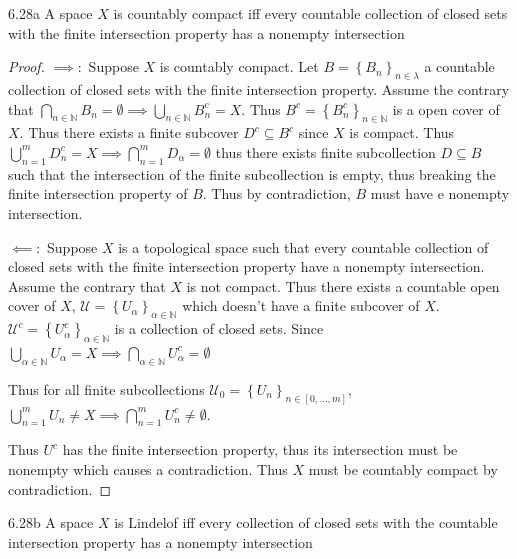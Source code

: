 \documentclass{article}
\newcommand{\N}{\mathbb{N}}
\begin{document}
\bigskip

\begin{claim}{6.28a}\label{Claim 6.28a.}
    A space $X$ is countably compact iff every countable collection of closed sets with the finite intersection property has a nonempty intersection 
\end{claim}
\begin{proof}
    $\implies:$ Suppose $X$ is countably compact. Let $B = \left\{ B_n \right\}_{n \in \lambda}$ a countable collection of closed sets with the finite intersection property.  Assume the contrary that $\bigcap_{n \in \N} B_n = \emptyset \implies \bigcup_{n \in \N} B_{n}^c = X$. Thus $B^c = \left\{ B_{n}^c \right\}_{n \in \N}$ is a open cover of $X$. Thus there exists a finite subcover $D^c \subseteq B^c$ since $X$ is compact. Thus $\bigcup_{n = 1}^m D^c_n = X \implies \bigcap_{n = 1}^m D_\alpha = \emptyset$ thus there exists finite subcollection $D \subseteq B$ such that the intersection of the finite subcollection is empty, thus breaking the finite intersection property of $B$. Thus by contradiction, $B$ must have e nonempty intersection.
    
    $\impliedby:$ Suppose $X$ is a topological space such that every countable collection of closed sets with the finite intersection property have a nonempty intersection. Assume the contrary that $X$ is not compact. Thus there exists a countable open cover of $X$, $\mathcal{U} = \left\{ U_\alpha \right\}_{\alpha \in \N}$ which doesn't have a finite subcover of $X$. $\mathcal{U}^c = \left\{ U_\alpha^c \right\}_{\alpha \in \N}$ is a collection of closed sets. Since $\bigcup_{\alpha \in \N} U_\alpha = X \implies \bigcap_{\alpha \in \N} U_\alpha^c = \emptyset$ 
    
    Thus for all finite subcollections $\mathcal{U}_0 = \left\{ U_{n} \right\}_{n \in \left[0, \dots, m\right]}$, $\bigcup_{n = 1}^{m} U_n \neq X \implies \bigcap_{n = 1}^{m}U_n^c \neq \emptyset$. 
    
    Thus $U^c$ has the finite intersection property, thus its intersection must be nonempty which causes a contradiction. Thus $X$ must be countably compact by contradiction.  
\end{proof}
\bigskip
\begin{claim}{6.28b}\label{Claim 6.28b.}
    A space $X$ is Lindelof iff every collection of closed sets with the countable intersection property has a nonempty intersection 
\end{claim}
\end{document}

